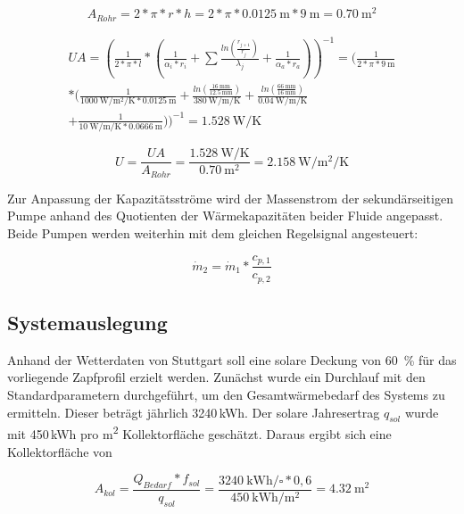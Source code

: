\begin{equation}
	\label{eq:Arohr}
	A_{Rohr} = 2*\pi*r*h = 2*\pi*\SI{0,0125}{\meter}*\SI{9}{\meter}=\SI{0,70}{\square\meter}
\end{equation}

\begin{multline}
	\label{eq:UA}
UA = (\frac{1}{2*\pi*l}*(\frac{1}{\alpha_i*r_i}+\sum\frac{ln(\frac{r_{j+1}}{r_j})}{\lambda_j}+\frac{1}{\alpha_a*r_a}))^{-1} = (\frac{1}{2*\pi*\SI{9}{\meter}}\\*(\frac{1}{\SI{1000}{\watt\per\square\meter\per\kelvin}*\SI{0,0125}{\meter}}+\frac{ln(\frac{\SI{16}{\milli\meter}}{\SI{12,5}{\milli\meter}})}{\SI{380}{\watt\per\meter\per\kelvin}}+\frac{ln(\frac{\SI{66}{\milli\meter}}{\SI{16}{\milli\meter}})}{\SI{0,04}{\watt\per\meter\per\kelvin}}\\+\frac{1}{\SI{10}{\watt\per\meter\per\kelvin}*\SI{0,0666}{\meter}}))^{-1}=\SI{1,528}{\watt\per\kelvin}
\end{multline}


\begin{equation}
	\label{eq:U}
	U=\frac{UA}{A_{Rohr}}=\frac{\SI{1,528}{\watt\per\kelvin}}{\SI{0,70}{\square\meter}}=\SI{2,158}{\watt\per\square\meter\per\kelvin}
\end{equation}


Zur Anpassung der Kapazitätsströme wird der Massenstrom der sekundärseitigen Pumpe anhand des Quotienten der Wärmekapazitäten beider Fluide angepasst. Beide Pumpen werden weiterhin mit dem gleichen Regelsignal angesteuert:

\begin{equation}
	\label{eq:dotm}
	\dot m_{2}=\dot m_{1}*\frac{c_{p,1}}{c_{p,2}}
\end{equation}


\subsection{Systemauslegung}
Anhand der Wetterdaten von Stuttgart soll eine solare Deckung von \SI{60}{\percent} für das vorliegende Zapfprofil erzielt werden. Zunächst wurde ein Durchlauf mit den Standardparametern durchgeführt, um den Gesamtwärmebedarf des Systems zu ermitteln. Dieser beträgt jährlich 3240\,kWh. Der solare Jahresertrag $q_{sol}$ wurde mit 450\,kWh pro m\textsuperscript{2} Kollektorfläche geschätzt. Daraus ergibt sich eine Kollektorfläche von

\begin{equation}
	\label{eq:}
	A_{kol}=\frac{Q_{Bedarf}*f_{sol}}{q_{sol}}=\frac{\SI{3240}{\kilo\watt\hour\per\square}*0,6}{\SI{450}{\kilo\watt\hour\per\square\meter}}=\SI{4,32}{\square\meter}
\end{equation}

